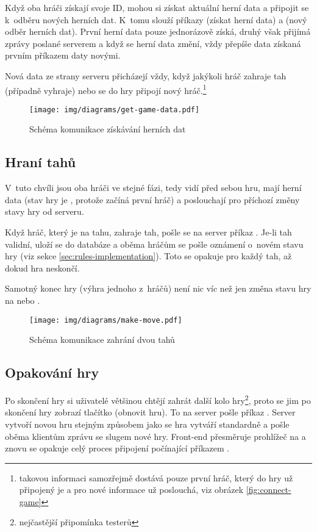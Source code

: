 
Když oba hráči získají svoje ID, mohou si získat aktuální herní data a připojit
se k~odběru nových herních dat. K~tomu slouží příkazy  (získat
herní data) a  (nový odběr herních dat). První herní
data pouze jednorázově získá, druhý však přijímá zprávy poslané serverem a když
se herní data změní, vždy přepíše data získaná prvním příkazem daty novými.

Nová data ze strany serveru přicházejí vždy, když jakýkoli hráč zahraje tah
(případně vyhraje) nebo se do hry připojí nový hráč.\footnote{takovou informaci
samozřejmě dostává pouze první hráč, který do hry už připojený je a pro nové
informace už poslouchá, viz obrázek \ref{fig:connect-game}}

\begin{figure}[H]
    \centering
    \texttt{[image: img/diagrams/get-game-data.pdf]}
    \caption{Schéma komunikace získávání herních dat}
    \label{fig:get-game-data}
\end{figure}

\subsection{Hraní tahů}

V~tuto chvíli jsou oba hráči ve stejné fázi, tedy vidí před sebou hru, mají
herní data (stav hry je , protože začíná první hráč) a
poslouchají pro příchozí změny stavy hry od serveru.

Když hráč, který je na tahu, zahraje tah, pošle se na server příkaz .
Je-li tah validní, uloží se do databáze a oběma hráčům se pošle oznámení
 o~novém stavu hry (viz sekce \ref{sec:rules-implementation}).
Toto se opakuje pro každý tah, až dokud hra neskončí.

Samotný konec hry (výhra jednoho z~hráčů) není nic víc než jen změna stavu hry
na  nebo .

\begin{figure}[H]
    \centering
    \texttt{[image: img/diagrams/make-move.pdf]}
    \caption{Schéma komunikace zahrání dvou tahů}
    \label{fig:make-move}
\end{figure}

\subsection{Opakování hry}
Po skončení hry si uživatelé většinou chtějí zahrát další kolo
hry\footnote{nejčastější připomínka testerů}, proto se jim po skončení hry
zobrazí tlačítko  (obnovit hru). To na server pošle příkaz
. Server vytvoří novou hru stejným způsobem jako se hra vytváří
standardně a pošle oběma klientům zprávu  se slugem nové hry.
Front-end přesměruje prohlížeč na  a znovu se opakuje celý
proces připojení počínající příkazem .

